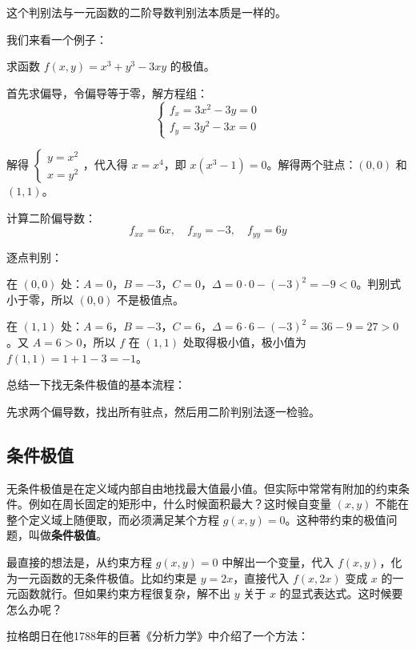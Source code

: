 这个判别法与一元函数的二阶导数判别法本质是一样的。

我们来看一个例子：

\begin{myexample}
  求函数 $f(x, y) = x^3 + y^3 - 3xy$ 的极值。

  首先求偏导，令偏导等于零，解方程组：
  \[
  \begin{cases}
    f_x = 3x^2 - 3y = 0\\
    f_y = 3y^2 - 3x = 0
  \end{cases}
  \]

  解得 $\begin{cases}
    y = x^2\\
    x = y^2
  \end{cases}$，代入得 $x = x^4$，即 $x(x^3 - 1) = 0$。解得两个驻点：$(0, 0)$ 和 $(1, 1)$。

计算二阶偏导数：
  \[
  f_{xx} = 6x,\quad f_{xy} = -3,\quad f_{yy} = 6y
  \]

逐点判别：

在 $(0, 0)$ 处：$A = 0$，$B = -3$，$C = 0$，$\Delta = 0\cdot0 - (-3)^2 = -9 < 0$。判别式小于零，所以 $(0, 0)$ 不是极值点。

在 $(1, 1)$ 处：$A = 6$，$B = -3$，$C = 6$，$\Delta = 6\cdot6 - (-3)^2 = 36-9=27 > 0$。又 $A=6>0$，所以 $f$ 在 $(1, 1)$ 处取得极小值，极小值为 $f(1, 1) = 1+1-3 = -1$。

\end{myexample}

总结一下找无条件极值的基本流程：

先求两个偏导数，找出所有驻点，然后用二阶判别法逐一检验。

\subsection{条件极值}

无条件极值是在定义域内部自由地找最大值最小值。但实际中常常有附加的约束条件。例如在周长固定的矩形中，什么时候面积最大？这时候自变量 $(x, y)$ 不能在整个定义域上随便取，而必须满足某个方程 $g(x, y) = 0$。这种带约束的极值问题，叫做\textbf{条件极值}。

最直接的想法是，从约束方程 $g(x, y) = 0$ 中解出一个变量，代入 $f(x, y)$，化为一元函数的无条件极值。比如约束是 $y = 2x$，直接代入 $f(x, 2x)$ 变成 $x$ 的一元函数就行。但如果约束方程很复杂，解不出 $y$ 关于 $x$ 的显式表达式。这时候要怎么办呢？

拉格朗日在他1788年的巨著《分析力学》中介绍了一个方法：

